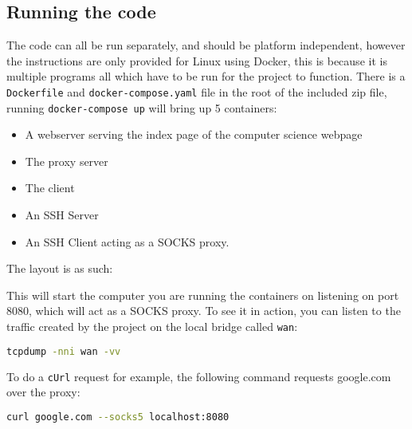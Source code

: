 \subsection{Running the code}
The code can all be run separately, and should be platform independent, however the instructions are only provided for Linux using Docker, this is because it is multiple programs all which have to be run for the project to function.
There is a \texttt{Dockerfile} and \texttt{docker-compose.yaml} file in the root of the included zip file, running \texttt{docker-compose up} will bring up 5 containers:
\begin{itemize}
    \item A webserver serving the index page of the computer science webpage
    \item The proxy server
    \item The client
    \item An SSH Server
    \item An SSH Client acting as a SOCKS proxy.
\end{itemize}
The layout is as such:
\begin{center}
\end{center}
This will start the computer you are running the containers on listening on port 8080, which will act as a SOCKS proxy.
To see it in action, you can listen to the traffic created by the project on the local bridge called \texttt{wan}:
\begin{lstlisting}[language=bash,numbers=none]
    tcpdump -nni wan -vv
\end{lstlisting}
To do a \texttt{cUrl} request for example, the following command requests google.com over the proxy:
\begin{lstlisting}[language=bash,numbers=none]
    curl google.com --socks5 localhost:8080
\end{lstlisting}
